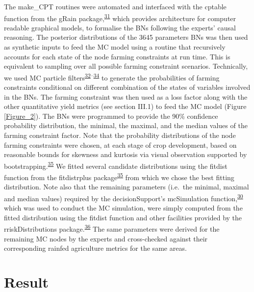 \documentclass[11pt,preprint]{article}
\begin{document}
The make\_CPT routines were automated and interfaced with the cptable
function from the gRain
package,\textsuperscript{\protect\hyperlink{ref-Hojsgaard_2012}{31}}
which provides architecture for computer readable graphical models, to
formalise the BNs following the experts' causal reasoning. The posterior
distributions of the 3645 parameters BNs was then used as synthetic
inputs to feed the MC model using a routine that recursively accounts
for each state of the node farming constraints at run time. This is
equivalent to sampling over all possible farming constraint scenarios.
Technically, we used MC particle
filters\textsuperscript{\protect\hyperlink{ref-Kitagawa_2016}{32}--\protect\hyperlink{ref-Scutari_2010}{34}}
to generate the probabilities of farming constraints conditional on
different combination of the states of variables involved in the BNs.
The farming constraint was then used as a loss factor along with the
other quantitative yield metrics (see section III.1) to feed the MC
model (Figure \ref{Figure_2}). The BNs were programmed to provide the
90\% confidence probability distribution, the minimal, the maximal, and
the median values of the farming constraint factor. Note that the
probability distributions of the node farming constraints were chosen,
at each stage of crop development, based on reasonable bounds for
skewness and kurtosis via visual observation supported by
bootstrapping.\textsuperscript{\protect\hyperlink{ref-Delignette-Muller_and_Dutang_2015}{35}}
We fitted several candidate distributions using the fitdist function
from the fitdistrplus
package\textsuperscript{\protect\hyperlink{ref-Delignette-Muller_and_Dutang_2015}{35}}
from which we chose the best fitting distribution. Note also that the
remaining parameters (i.e.~the minimal, maximal and median values)
required by the decisionSupport's mcSimulation
function,\textsuperscript{\protect\hyperlink{ref-Luedeling_and_Goehring_2018}{30}}
which was used to conduct the MC simulation, were simply computed from
the fitted distribution using the fitdist function and other facilities
provided by the rriskDistributions
package.\textsuperscript{\protect\hyperlink{ref-Belgorodski_et_al_2017}{36}}
The same parameters were derived for the remaining MC nodes by the
experts and cross-checked against their corresponding rainfed
agriculture metrics for the same areas.

\hypertarget{result}{%
\section{Result}\label{result}}
\end{document}

